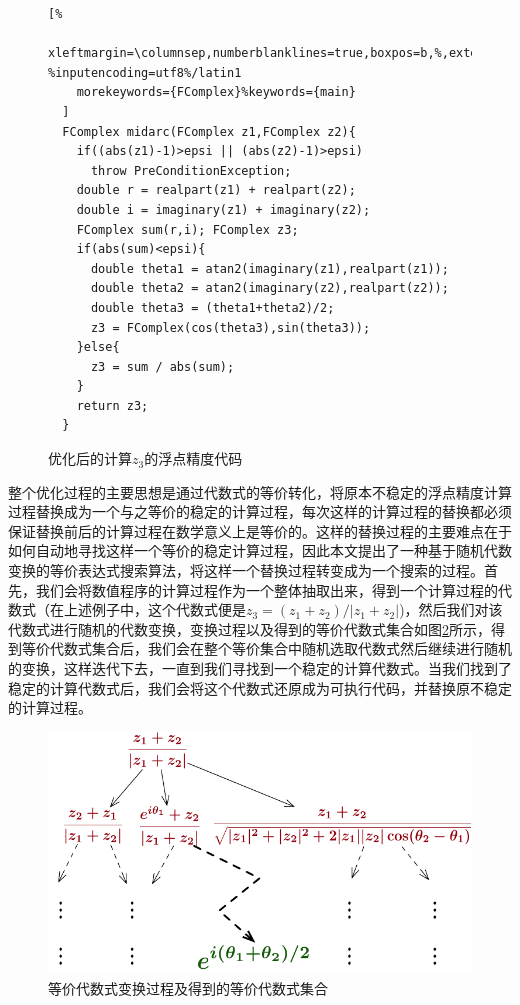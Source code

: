 \begin{figure}[thbp]
  \begin{lstlisting}[%
    xleftmargin=\columnsep,numberblanklines=true,boxpos=b,%,extendedchars=\true, %inputencoding=utf8%/latin1
    morekeywords={FComplex}%keywords={main}
  ]
  FComplex midarc(FComplex z1,FComplex z2){
    if((abs(z1)-1)>epsi || (abs(z2)-1)>epsi)
      throw PreConditionException;
    double r = realpart(z1) + realpart(z2);      
    double i = imaginary(z1) + imaginary(z2);    
    FComplex sum(r,i); FComplex z3;              
    if(abs(sum)<epsi){
      double theta1 = atan2(imaginary(z1),realpart(z1));
      double theta2 = atan2(imaginary(z2),realpart(z2));
      double theta3 = (theta1+theta2)/2;
      z3 = FComplex(cos(theta3),sin(theta3));
    }else{
      z3 = sum / abs(sum);                       
    }
    return z3;
  }
  \end{lstlisting}
  \caption{优化后的计算$z_3$的浮点精度代码}
  \label{lst:exoptcode}
\end{figure}

整个优化过程的主要思想是通过代数式的等价转化，将原本不稳定的浮点精度计算过程替换成为一个与之等价的稳定的计算过程，每次这样的计算过程的替换都必须保证替换前后的计算过程在数学意义上是等价的。这样的替换过程的主要难点在于如何自动地寻找这样一个等价的稳定计算过程，因此本文提出了一种基于随机代数变换的等价表达式搜索算法，将这样一个替换过程转变成为一个搜索的过程。首先，我们会将数值程序的计算过程作为一个整体抽取出来，得到一个计算过程的代数式（在上述例子中，这个代数式便是$z_3=(z_1+z_2)/|z_1+z_2|$)，然后我们对该代数式进行随机的代数变换，变换过程以及得到的等价代数式集合如图\ref{fig:eqspace}所示，得到等价代数式集合后，我们会在整个等价集合中随机选取代数式然后继续进行随机的变换，这样迭代下去，一直到我们寻找到一个稳定的计算代数式。当我们找到了稳定的计算代数式后，我们会将这个代数式还原成为可执行代码，并替换原不稳定的计算过程。

\begin{figure}[thb]
  \centering
  \vspace*{1mm}
  \includegraphics[width=120mm]{fig/EquivalentSpace.pdf}
  \vspace*{1mm}
  \caption{等价代数式变换过程及得到的等价代数式集合} \label{fig:eqspace} %
\end{figure}

